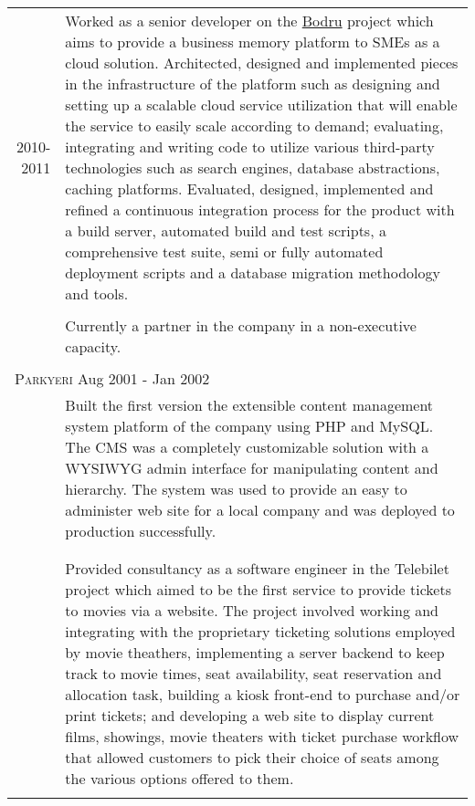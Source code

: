\documentclass[a4paper,10pt]{article}
\newcommand{\exptitle}[2]{
  \multicolumn{2}{l}{\textsc{#1} \footnotesize{#2}} \\
  \specialrule{.01em}{0.5em}{1em}
}
\begin{document}
\begin{longtable}{r|p{11cm}}
  \textsc{2010-2011}            & Worked as a senior developer on the \href{http://www.bodru.com}{Bodru} project which aims to provide a business memory platform to SMEs as a cloud solution. Architected, designed and implemented pieces in the infrastructure of the platform such as designing and setting up a scalable cloud service utilization that will enable the service to easily scale according to demand; evaluating, integrating and writing code to utilize various third-party technologies such as search engines, database abstractions, caching platforms. Evaluated, designed, implemented and refined a continuous integration process for the product with a build server, automated build and test scripts, a comprehensive test suite, semi or fully automated deployment scripts and a database migration methodology and tools. \\
  \multicolumn{2}{c}{} \\

                                & Currently a partner in the company in a non-executive capacity. \\
  \multicolumn{2}{c}{} \\

  \exptitle{Parkyeri}{Aug 2001 - Jan 2002}

                                & Built the first version the extensible content management system platform of the company using PHP and MySQL. The CMS was a completely customizable solution with a WYSIWYG admin interface for manipulating content and hierarchy. The system was used to provide an easy to administer web site for a local company and was deployed to production successfully. \\
  \multicolumn{2}{c}{} \\

  \newpage

  \exptitle{Turk.Net}{Dec 2000 - Apr 2001}

                                & Provided consultancy as a software engineer in the Telebilet project which aimed to be the first service to provide tickets to movies via a website. The project involved working and integrating with the proprietary ticketing solutions employed by movie theathers, implementing a server backend to keep track to movie times, seat availability, seat reservation and allocation task, building a kiosk front-end to purchase and/or print tickets; and developing a web site to display current films, showings, movie theaters with ticket purchase workflow that allowed customers to pick their choice of seats among the various options offered to them. \\
  \multicolumn{2}{c}{} \\




\end{longtable}
\end{document}
